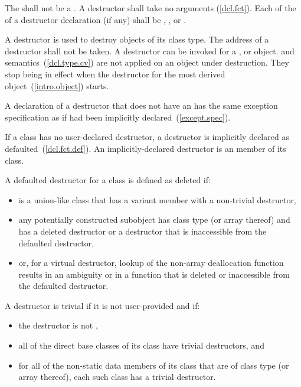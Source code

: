 The  shall not be a . A
destructor shall take no arguments (\ref{dcl.fct}).
Each  of the 
of a destructor declaration (if any) shall be , , or
.

\pnum
A destructor is used to destroy objects of its class type.
%
The address of a destructor shall not be taken.
%
%
A destructor can be invoked for a
,
or
object.
and
semantics~(\ref{dcl.type.cv}) are not applied on an object under destruction.
They stop being in effect when the destructor for the
most derived object~(\ref{intro.object}) starts.

\pnum
A declaration of a destructor that does not have an 
has the same exception specification as if had been implicitly declared~(\ref{except.spec}).

\pnum
{}%
%
%
If a class has no user-declared
destructor, a destructor is implicitly
declared as defaulted~(\ref{dcl.fct.def}).
An implicitly-declared destructor is an
member of its class.

\pnum
A defaulted destructor for a class
   is defined as deleted if:
\begin{itemize}
\item {} is a union-like class that has a variant
  member with a non-trivial destructor,

\item any potentially constructed subobject has class type
   (or array thereof) and
   has a deleted destructor or a destructor
  that is inaccessible from the defaulted destructor,

\item or, for a virtual destructor, lookup of the non-array deallocation
  function results in an ambiguity or in a function that is deleted or
  inaccessible from the defaulted destructor.
\end{itemize}

\pnum
A destructor is trivial if it is not user-provided and if:

\begin{itemize}
\item the destructor is not ,

\item all of the direct base classes of its class have trivial destructors, and

\item for all of the non-static data members of its class that are of class
type (or array thereof), each such class has a trivial destructor.
\end{itemize}

